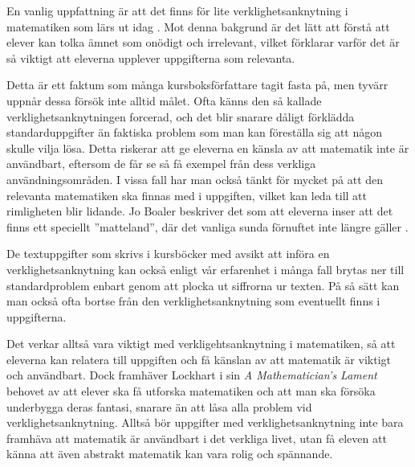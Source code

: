 \textcolor{lila}{En vanlig uppfattning är att det finns för lite verklighetsanknytning i matematiken som lärs ut idag \cite{TheElephant}. Mot denna bakgrund är det lätt att förstå att elever kan tolka ämnet som onödigt och irrelevant, vilket förklarar varför det är så viktigt att eleverna upplever uppgifterna som relevanta.}

\textcolor{lila}{Detta är ett faktum som många kursboksförfattare \todo{!} tagit fasta på, men tyvärr uppnår dessa försök inte alltid målet. Ofta känns den så kallade verklighetsanknytningen forcerad, och det blir snarare dåligt förklädda standarduppgifter än faktiska problem som man kan föreställa sig att någon skulle vilja lösa. Detta riskerar att ge eleverna en känsla av att matematik inte är användbart, eftersom de får se så få exempel från dess verkliga användningsområden.
I vissa fall har man också tänkt för mycket på att den relevanta matematiken ska finnas med i uppgiften, vilket kan leda till att rimligheten blir lidande. Jo Boaler beskriver det som att eleverna inser att det finns ett speciellt ''matteland'', där det vanliga sunda förnuftet inte längre gäller \cite{TheElephant}.}
    
\textcolor{lila}{De textuppgifter som skrivs  i kursböcker med avsikt att införa en verklighetsanknytning kan också enligt vår erfarenhet i många fall brytas ner till standardproblem enbart genom att plocka ut siffrorna ur texten. På så sätt kan man också ofta bortse från den verklighetsanknytning som eventuellt finns i uppgifterna.}

\textcolor{lila}{Det verkar alltså vara viktigt med verkligehtsanknytning i matematiken, så att eleverna kan relatera till uppgiften och få känslan av att matematik är viktigt och användbart.} \textcolor{Mahogany}{Dock framhäver Lockhart i sin \textsl{A Mathematician's Lament} \cite{lockhart} behovet av att elever ska få utforska matematiken och att man ska försöka underbygga deras fantasi, snarare än att låsa alla problem vid verklighetsanknytning. Alltså bör uppgifter med verklighetsanknytning inte bara framhäva att matematik är användbart i det verkliga livet, utan få eleven att känna att även abstrakt matematik kan vara rolig och spännande.}